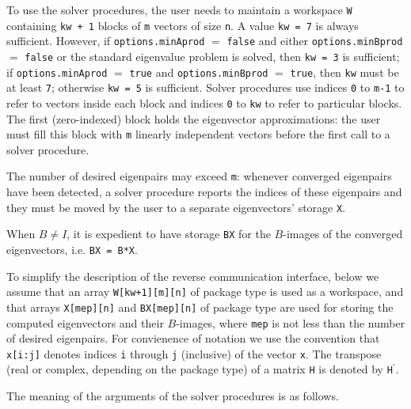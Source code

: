 \medskip
\noindent
To use the solver procedures,
the user needs to maintain a workspace {\tt W} containing
{\tt kw + 1} blocks of {\tt m} vectors of size {\tt n}.
A value {\tt kw = 7} is always sufficient. 
However, if {\tt options.minAprod} $=$ {\tt false}
and either {\tt options.minBprod} $=$ {\tt false} or 
the standard eigenvalue problem  is solved,
then {\tt kw = 3} is sufficient; 
if 
{\tt options.minAprod} $=$ {\tt true} and
{\tt options.minBprod} $=$ {\tt true},
then {\tt kw} must be at least {\tt 7};
otherwise {\tt kw = 5} is sufficient.
Solver procedures
use indices {\tt 0} to {\tt m-1} 
to refer to vectors inside each block
and indices {\tt 0} to {\tt kw} 
to refer to particular blocks.
The first (zero-indexed) block holds the eigenvector approximations:
the user must fill this block with 
{\tt m} linearly independent vectors before the first call
to a solver procedure.

The number of desired eigenpairs may exceed {\tt m}:
whenever converged eigenpairs have been detected,
a solver procedure reports the indices of these eigenpairs
and they must be moved by the user
to a separate eigenvectors' storage {\tt X}.

When $B \ne I$,
it is expedient to 
have
storage {\tt BX}
for the $B$-images of the converged eigenvectors,
i.e. {\tt BX = B*X}.

To simplify the description of the
reverse communication interface,
below we assume that an array
{\tt W[kw+1][m][n]} of package type
is used as a workspace,
and that arrays {\tt X[mep][n]} and {\tt BX[mep][n]} of package type
are used for storing the computed eigenvectors
and their $B$-images,
where {\tt mep} is not less than the number of desired eigenpairs.
For convienence of notation we use the convention that \texttt{x[i:j]}
denotes indices {\tt i} through {\tt j} (inclusive) of the vector {\tt x}.
The transpose (real or complex, depending on the package type)
of a matrix {\tt H} 
is denoted by {\tt H}$^\prime$.

\medskip
\noindent
The meaning of the arguments of the solver procedures is as follows.

